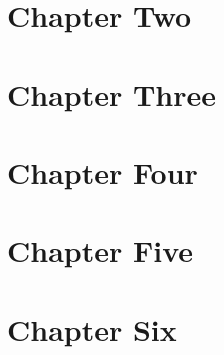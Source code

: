 \newcommand{\booktitle}{Loot, Strings, and Heartbreak}



\precontent{}

\mainmatter



\chapter{Chapter Two}
\chapter{Chapter Three}
\chapter{Chapter Four}
\chapter{Chapter Five}
\chapter{Chapter Six}




